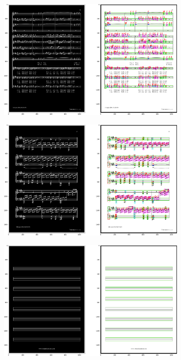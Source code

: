 \documentclass[12pt]{article}
\begin{document}
\begin{enumerate}
\begin{figure}[h!]
\begin{subfigure}[b]{0.48\linewidth}
				\end{subfigure}
				\begin{subfigure}[b]{0.48\linewidth}
					\includegraphics[width=\linewidth]{Eazy/Zdj33.png}
				\end{subfigure}
				\begin{subfigure}[b]{0.48\linewidth}
					\includegraphics[width=\linewidth]{Eazy/Zdj34.png}
				\end{subfigure}
				\begin{subfigure}[b]{0.48\linewidth}
					\includegraphics[width=\linewidth]{Eazy/Zdj35.png}

\end{subfigure}
\end{figure}
\end{enumerate}
\end{document}
